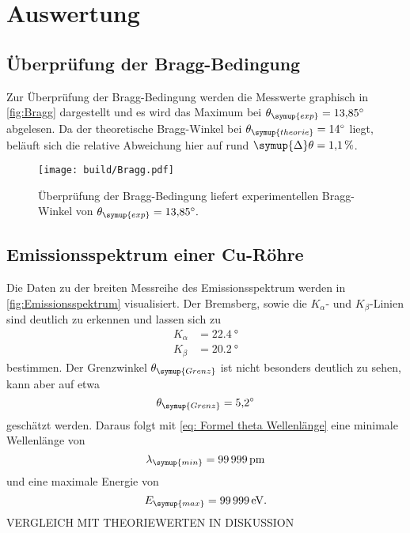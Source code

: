 \section{Auswertung}
\label{sec:Auswertung}

\subsection{Überprüfung der Bragg-Bedingung}
Zur Überprüfung der Bragg-Bedingung werden die Messwerte graphisch in \autoref{fig:Bragg} dargestellt und es wird das Maximum bei
$\theta_{\symup{exp}}=\qty{13.85}{\degree}$ abgelesen. Da der theoretische Bragg-Winkel bei $\theta_{\symup{theorie}} = \qty{14}{\degree}$
liegt, beläuft sich die relative Abweichung hier auf rund $\symup{\Delta}\theta = \qty{1,1}{\percent}$.

\begin{figure}[H]
  \centering
  \texttt{[image: build/Bragg.pdf]}
  \caption{Überprüfung der Bragg-Bedingung liefert experimentellen Bragg-Winkel von $\theta_{\symup{exp}}=\qty{13.85}{\degree}.$}
  \label{fig:Bragg}
\end{figure}

\subsection{Emissionsspektrum einer Cu-Röhre}
Die Daten zu der breiten Messreihe des Emissionsspektrum werden in \autoref{fig:Emissionsspektrum} visualisiert. Der Bremsberg, sowie die 
$K_{\alpha}$- und $K_{\beta}$-Linien sind deutlich zu erkennen und lassen sich zu
\begin{align*}
    K_{\alpha} &= \qty{22,4}{\degree} \\
    K_{\beta} &= \qty{20,2}{\degree}
\end{align*}
bestimmen. Der Grenzwinkel $\theta_{\symup{Grenz}}$ ist nicht besonders deutlich zu sehen, kann aber auf etwa
\begin{equation*}
  \theta_{\symup{Grenz}} = \qty{5,2}{\degree}
\end{equation*}
geschätzt werden. Daraus folgt mit \eqref{eq: Formel theta Wellenlänge} eine minimale Wellenlänge von 
\begin{equation*}
  \lambda_{\symup{min}} = \qty{99999}{\pico\metre}
\end{equation*}
und eine maximale Energie von
\begin{equation*}
  E_{\symup{max}} = \qty{99999}{\electronvolt}.
\end{equation*}
VERGLEICH MIT THEORIEWERTEN IN DISKUSSION

